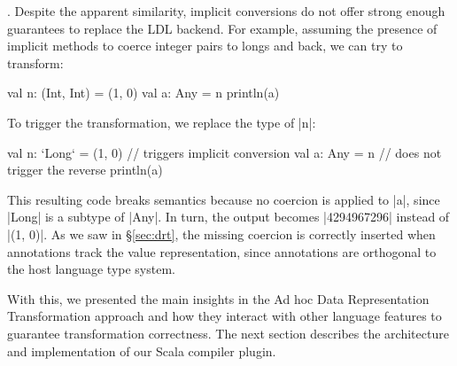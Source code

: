 \noindent
{}. Despite the apparent similarity, implicit conversions do not offer strong enough guarantees to replace the LDL backend. For example, assuming the presence of implicit methods to coerce integer pairs to longs and back, we can try to transform:

\begin{lstlisting-nobreak}
val n: (Int, Int) = (1, 0)
val a: Any = n
println(a)
\end{lstlisting-nobreak}

To trigger the transformation, we replace the type of |n|: %

\begin{lstlisting-nobreak}
val n: `Long` = (1, 0) // triggers implicit conversion
val a: Any = n              // does not trigger the reverse
println(a)
\end{lstlisting-nobreak}

This resulting code breaks semantics because no coercion is applied to |a|, since |Long| is a subtype of |Any|. In turn, the output becomes |4294967296| instead of |(1, 0)|.
As we saw in \S\ref{sec:drt}, the missing coercion is correctly inserted when annotations track the value representation,
since annotations are orthogonal to the host language type system.

With this, we presented the main insights in the Ad hoc Data Representation Transformation approach and how they interact with other language features to guarantee transformation correctness. The next section describes the architecture and implementation of our Scala compiler plugin.



